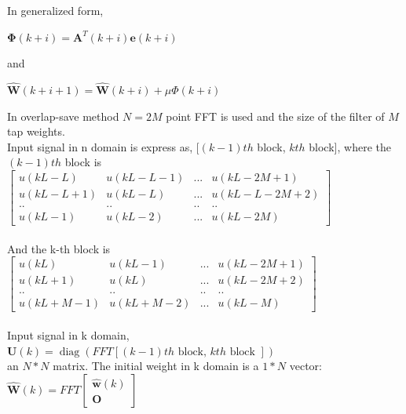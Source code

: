 \documentclass[conference]{IEEEtran}
\begin{document}
In generalized form,\\
\begin{center}
$\mathbf{\Phi}(k+i)=\mathbf{A}^{T}(k+i) \mathbf{e}(k+i)$
\end{center}
and
\begin{center}
$\hat{\mathbf{W}}(k+i+1)=\hat{\mathbf{W}}(k+i)+\mu \Phi(k+i)$
\end{center}
In overlap-save method $N=2M$ point FFT is used and the
size of the filter of $M$ tap weights.\\
Input signal in n domain is express as, $[(k-1)th$ block, $kth$ block], where the $(k-1)th$ block is \\
$\begin{bmatrix}
u(kL-L) & u(kL-L-1)   & ...  & u(kL-2M+1)\\ 
u(kL-L+1) & u(kL-L)   & ...  & u(kL-L-2M+2) \\ 
 ..& .. & .. & .. \\ 
u(kL-1) & u(kL-2) & ...  & u(kL-2M)
\end{bmatrix}$\\ \\

And the k-th block is \\
$\begin{bmatrix}
u(kL) & u(kL-1)  & ...  & u(kL-2M+1)\\ 
u(kL+1) & u(kL)   & ...  & u(kL-2M+2) \\ 
 ..& .. & .. & .. \\ 
u(kL+M-1) & u(kL+M-2)  & ...  & u(kL-M)
\end{bmatrix}$ \\ \\
Input signal in k domain,\\ 
$\mathbf{U}(k)=\operatorname{diag}(F F T[(k-1) t h \text { block, } k t h \text { block }])$\\
an $N*N$ matrix. The initial weight in k domain is a $1 * N$
vector: \\
$\hat{\mathbf{W}}(k)=F F T \left[ \begin{array}{l}{\hat{\mathbf{w}}(k)} \\ {\mathbf{O}}\end{array}\right]$ \\
\end{document}
